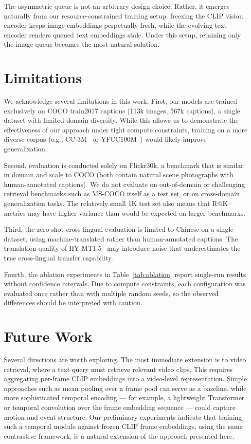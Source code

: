 \documentclass[10pt,leqno]{amsart}
\begin{document}
The asymmetric queue is not an arbitrary design choice. Rather, it emerges naturally from our resource-constrained training setup: freezing the CLIP vision encoder keeps image embeddings perpetually fresh, while the evolving text encoder renders queued text embeddings stale. Under this setup, retaining only the image queue becomes the most natural solution.

\section{Limitations}

We acknowledge several limitations in this work. First, our models are trained exclusively on COCO train2017 captions (113k images, 567k captions), a single dataset with limited domain diversity. While this allows us to demonstrate the effectiveness of our approach under tight compute constraints, training on a more diverse corpus (e.g., CC-3M~\citep{sharma2018conceptual} or YFCC100M~\citep{thomee2016yfcc100m}) would likely improve generalization.

Second, evaluation is conducted solely on Flickr30k, a benchmark that is similar in domain and scale to COCO (both contain natural scene photographs with human-annotated captions). We do not evaluate on out-of-domain or challenging retrieval benchmarks such as MS-COCO itself as a test set, or on cross-domain generalization tasks. The relatively small 1K test set also means that R@K metrics may have higher variance than would be expected on larger benchmarks.

Third, the zero-shot cross-lingual evaluation is limited to Chinese on a single dataset, using machine-translated rather than human-annotated captions. The translation quality of HY-MT1.5~\citep{hymt152025tencent} may introduce noise that underestimates the true cross-lingual transfer capability.

Fourth, the ablation experiments in Table~\ref{tab:ablation} report single-run results without confidence intervals. Due to compute constraints, each configuration was evaluated once rather than with multiple random seeds, so the observed differences should be interpreted with caution.

\section{Future Work}

Several directions are worth exploring. The most immediate extension is to video retrieval, where a text query must retrieve relevant video clips. This requires aggregating per-frame CLIP embeddings into a video-level representation. Simple approaches such as mean pooling over a frame pool can serve as a baseline, while more sophisticated temporal encoding --- for example, a lightweight Transformer or temporal convolution over the frame embedding sequence --- could capture motion and event structure. Our preliminary experiments indicate that training such a temporal module against frozen CLIP frame embeddings, using the same contrastive framework, is a natural extension of the approach presented here.
\end{document}
